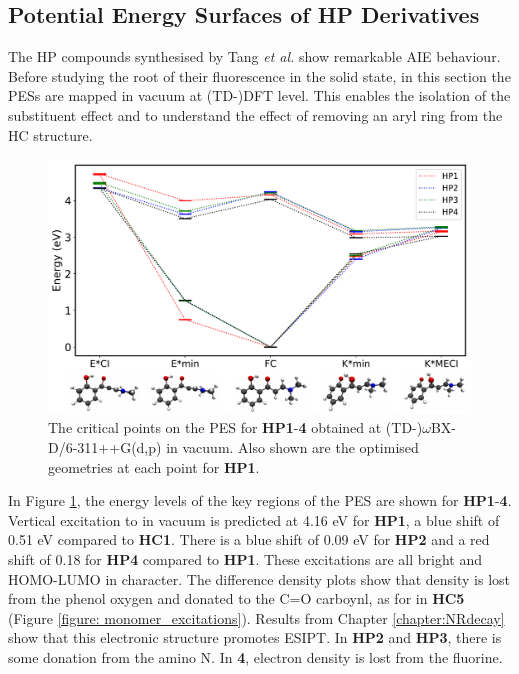 \subsection{Potential Energy Surfaces of \textbf{HP} Derivatives} \label{section: Connecting_Vacuum}
The \acf{HP} compounds synthesised by Tang \textit{et al.} show remarkable \ac{AIE} behaviour.  Before studying the root of their fluorescence in the solid state, in this section the \acp{PES} are mapped in vacuum at (TD-)DFT level. This enables the isolation of the substituent effect and to understand the effect of removing an aryl ring from the \ac{HC} structure. 
\begin{figure}[t]
\centering
  \includegraphics[width=0.8\linewidth]{5ConnectingCrystalStructure/2HP_energies_vac.pdf}
  \caption[The vacuum PES of HP\textbf{1}-\textbf{4} with TDDFT]{The critical points on the \ac{PES} for \textbf{HP}\textbf{1}-\textbf{4} obtained at (TD-)$\omega$BX-D/6-311++G(d,p) in vacuum. Also shown are the optimised geometries at each point for \textbf{HP1}.}
  \label{figure: HP_energies_vac}
\end{figure}


In Figure \ref{figure: HP_energies_vac}, the energy levels of the key regions of the \ac{PES} are shown for \textbf{HP1}-\textbf{4}. Vertical excitation to \sone{} in vacuum is predicted at 4.16 eV for \textbf{HP1}, a blue shift of 0.51 eV compared to \textbf{HC1}.  There is a blue shift of 0.09 eV for \textbf{HP2} and a red shift of 0.18 for \textbf{HP4} compared to \textbf{HP1}. These excitations are all  bright and HOMO-LUMO in character. The difference density plots show that density is lost from the phenol oxygen and donated to the C=O carboynl, as for \sone{} in \textbf{HC5} (Figure \ref{figure: monomer_excitations}). Results from Chapter \ref{chapter:NRdecay} show that this electronic structure promotes ESIPT. In \textbf{HP2} and \textbf{HP3}, there is some donation from the amino N. In \textbf{4}, electron density is lost from the fluorine. 

